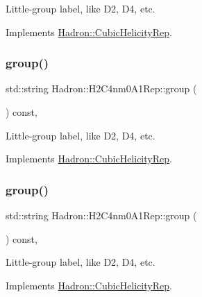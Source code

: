 Little-\/group label, like D2, D4, etc. 

Implements \mbox{\hyperlink{structHadron_1_1CubicHelicityRep_a101a7d76cd8ccdad0f272db44b766113}{Hadron\+::\+Cubic\+Helicity\+Rep}}.

\mbox{\label{structHadron_1_1H2C4nm0A1Rep_ae21ccc52d2b7461dd5dddbfa46b8f878}} 
\subsubsection{\texorpdfstring{group()}{group()}\hspace{0.1cm}{\footnotesize\ttfamily [2/3]}}
{\footnotesize\ttfamily std\+::string Hadron\+::\+H2\+C4nm0\+A1\+Rep\+::group (\begin{DoxyParamCaption}{ }\end{DoxyParamCaption}) const\hspace{0.3cm}{\ttfamily [inline]}, {\ttfamily [virtual]}}

Little-\/group label, like D2, D4, etc. 

Implements \mbox{\hyperlink{structHadron_1_1CubicHelicityRep_a101a7d76cd8ccdad0f272db44b766113}{Hadron\+::\+Cubic\+Helicity\+Rep}}.

\mbox{\label{structHadron_1_1H2C4nm0A1Rep_ae21ccc52d2b7461dd5dddbfa46b8f878}} 
\subsubsection{\texorpdfstring{group()}{group()}\hspace{0.1cm}{\footnotesize\ttfamily [3/3]}}
{\footnotesize\ttfamily std\+::string Hadron\+::\+H2\+C4nm0\+A1\+Rep\+::group (\begin{DoxyParamCaption}{ }\end{DoxyParamCaption}) const\hspace{0.3cm}{\ttfamily [inline]}, {\ttfamily [virtual]}}

Little-\/group label, like D2, D4, etc. 

Implements \mbox{\hyperlink{structHadron_1_1CubicHelicityRep_a101a7d76cd8ccdad0f272db44b766113}{Hadron\+::\+Cubic\+Helicity\+Rep}}.

